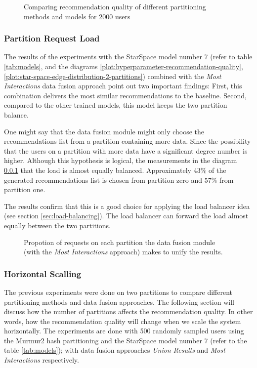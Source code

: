 \begin{figure}[!htb]
    \centering
    
    \caption{Comparing recommendation quality of different partitioning methods and models for 2000 users}
    \label{plot:hyperparameter-recommendation-quality-2000-users}
\end{figure}


\subsubsection{Partition Request Load}
\label{subsubsec:partition-request-load}
The results of the experiments with the StarSpace model number 7 (refer to table \ref{tab:models}, and the diagrams \ref{plot:hyperparameter-recommendation-quality}, \ref{plot:star-space-edge-distribution-2-partitions}) combined with the \emph{Most Interactions} data fusion approach point out two important findings: First, this combination delivers the most similar recommendations to the baseline. Second, compared to the other trained models, this model keeps the two partition balance.


One might say that the data fusion module might only choose the recommendations list from a partition containing more data. Since the possibility that the users on a partition with more data have a significant degree number is higher. Although this hypothesis is logical, the measurements in the diagram \ref{subsubsec:partition-request-load} that the load is almost equally balanced. Approximately 43\% of the generated recommendations list is chosen from partition zero and 57\% from partition one.

The results confirm that this is a good choice for applying the load balancer idea (see section \ref{sec:load-balancing}). The load balancer can forward the load almost equally between the two partitions.

\begin{figure}[!htb]
    \centering
    
    \caption{Propotion of requests on each partition the data fusion module (with the \emph{Most Interactions} approach) makes to unify the results.}
    \label{plot:request-distribution}
\end{figure}


\subsubsection{Horizontal Scalling}
\label{subsubsec:eval-horizontal-scalling}
The previous experiments were done on two partitions to compare different partitioning methods and data fusion approaches. The following section will discuss how the number of partitions affects the recommendation quality. In other words, how the recommendation quality will change when we scale the system horizontally. The experiments are done with 500 randomly sampled users using the Murmur2 hash partitioning and the StarSpace model number 7 (refer to the table \ref{tab:models}); with data fusion approaches \emph{Union Results} and \emph{Most Interactions} respectively.


